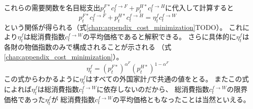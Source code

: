 これらの需要関数を名目総支出\(p_t^{F*}c_t^{f\to F}+p_t^{H*}c_t^{f\to H}\)に代入して計算すると
\begin{equation}
\label{form:chapter3_households_stage1b_foreign_c_f_W_problem_eta_f_average_eq}
    p_t^{F*}c_t^{f\to F}+p_t^{H*}c_t^{f\to H}=\eta_t^fc_t^{f\to W}
\end{equation}
という関係が得られる（式\eqref{chap:appendix_cost_minimization}TODO）。
これにより\(\eta_t^f\)は総消費指数\(c_t^{f\to W}\)の平均価格であると解釈できる。
さらに具体的に\(\eta_t^f\)は各財の物価指数のみで構成されることが示される
（式\eqref{chap:appendix_cost_minimization}）。
\begin{equation}
\label{form:chapter3_households_stage1b_foreign_c_f_W_problem_eta_f_eq}
    \eta_t^f=(p_t^{F*})^{\alpha^F}(p_t^{H*})^{1-\alpha^F}
\end{equation}
この式からわかるように\(\eta_t^f\)はすべての外国家計\(f\)で共通の値をとる。
またこの式によれば\(\eta_t^f\)は総消費指数\(c_t^{f\to W}\)に依存しないのだから、
総消費指数\(c_t^{f\to W}\)の限界価格であった\(\eta_t^f\)が
総消費指数\(c_t^{f\to W}\)の平均価格ともなったことは当然といえる。

